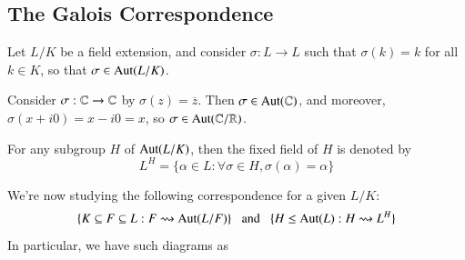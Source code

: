 \documentclass[12pt, a4paper, oneside, openright, titlepage]{book}
\begin{document}
\subsection{The Galois Correspondence}

Let $L/K$ be a field extension, and consider $\sigma:L\rightarrow L$ such that $\sigma(k) = k$ for all $k \in K$, so that $\sigma \in \operatorname{Aut}(L/K)$. 

\begin{eg}
    Consider $\sigma:\mathbb C\rightarrow \mathbb C$ by $\sigma(z) = \overline{z}$. Then $\sigma \in \operatorname{Aut}(\mathbb C)$, and moreover, $\sigma(x+i0) = x-i0 = x$, so $\sigma \in \operatorname{Aut}(\mathbb C/\mathbb R)$. 
\end{eg}

\begin{defn}
    For any subgroup $H$ of $\operatorname{Aut}(L/K)$, then the fixed field of $H$ is denoted by $$L^H = \{\alpha \in L:\forall \sigma \in H,\sigma(\alpha) = \alpha\}$$
\end{defn}

We're now studying the following correspondence for a given $L/K$:\begin{equation*}
    \{K\subseteq F\subseteq L:F\rightsquigarrow \operatorname{Aut}(L/F)\}\;\;\text{ and }\;\;\{H\leq \operatorname{Aut}(L):H\rightsquigarrow L^H\}
\end{equation*}
In particular, we have such diagrams as 
\begin{center}
\end{center}
\end{document}
